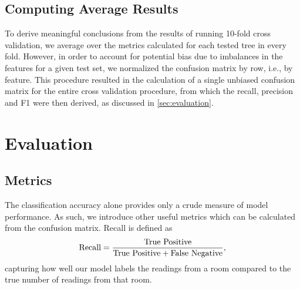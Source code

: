 \documentclass[11pt,twoside]{article}
\begin{document}
\subsection{Computing Average Results}
\label{sec:average}
To derive meaningful conclusions from the results of running 10-fold cross validation, we average over the metrics calculated for each tested tree in every fold. However, in order to account for potential bias due to imbalances in the features for a given test set, we normalized the confusion matrix by row, i.e., by feature. This procedure resulted in the calculation of a single unbiased confusion matrix for the entire cross validation procedure, from which the recall, precision and F1 were then derived, as discussed in \autoref{sec:evaluation}.




\section{Evaluation}
\label{sec:evaluation}
\subsection{Metrics}
The classification accuracy alone provides only a crude measure of model performance. As such, we introduce other useful metrics which can be calculated from the confusion matrix. 
\noindent
Recall is defined as 
\begin{equation}
\textnormal{Recall}=\frac{\textnormal{True Positive}}{\textnormal{True Positive}+\textnormal{False Negative}},
\end{equation}
capturing how well our model labels the readings from a room compared to the true number of readings from that room.
\end{document}

